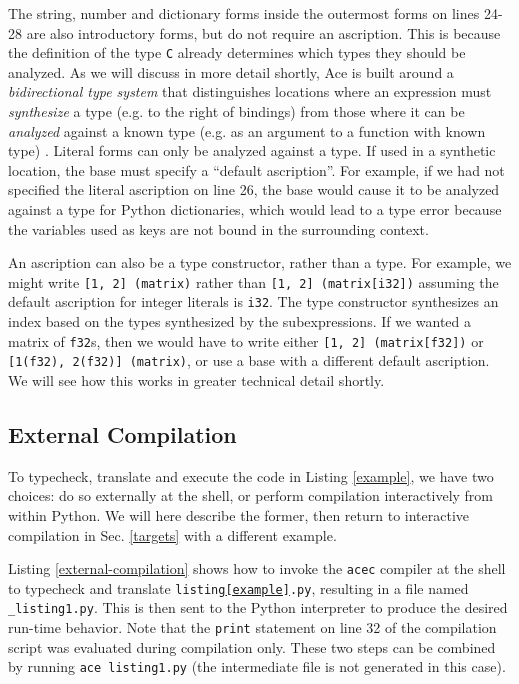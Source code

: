 \documentclass[10pt,preprint]{sigplanconf}
\begin{document}
{%
The string, number and dictionary forms inside the outermost forms on lines 24-28 are also introductory forms, but do not require an ascription. This is because the definition of the type \verb|C| already determines which types they should be analyzed. As we will discuss in more detail shortly, Ace is built around a \emph{bidirectional type system} that distinguishes locations where an expression must \emph{synthesize} a type (e.g. to the right of bindings) from those where it can be \emph{analyzed} against a known type (e.g. as an argument to a function with known type) \cite{Lovas08abidirectional}. Literal forms can only be analyzed against a type. If used in a synthetic location, the base must specify a ``default ascription''. For example, if we had not specified the literal ascription on line 26, the base would cause it to be analyzed against a type for Python dictionaries, which would lead to a type error because the variables used as keys are not bound in the surrounding context.

An ascription can also be a {type constructor}, rather than a type. For example, we might write \verb|[1, 2] (matrix)| rather than \verb|[1, 2] (matrix[i32])| assuming the default ascription for integer literals is \verb|i32|. The type constructor synthesizes an index based on the types synthesized by the subexpressions. If we wanted a matrix of \verb|f32|s, then we would have to write either \verb|[1, 2] (matrix[f32])| or \verb|[1(f32), 2(f32)] (matrix)|, or use a base with a different default ascription. We will see how this works in greater technical detail shortly.

\subsection{External Compilation}\label{compilation} 
To typecheck, translate and execute the code in Listing \ref{example}, we have two choices: do so externally at the shell, or perform compilation interactively from within Python. We will here describe the former, then return to interactive compilation in Sec. \ref{targets} with a different example. 

Listing \ref{external-compilation} shows how to invoke the \verb|acec| compiler at the shell to typecheck and translate \texttt{listing\ref{example}.py}, resulting in a file named \verb|_listing1.py|. This is then sent to the  Python interpreter to produce the desired run-time behavior. Note that the {\texttt{print}} statement on line 32 of the compilation script was  evaluated during compilation only. These two steps can be combined by running \verb|ace listing1.py| (the intermediate file is not generated in this case).

}
\end{document}
